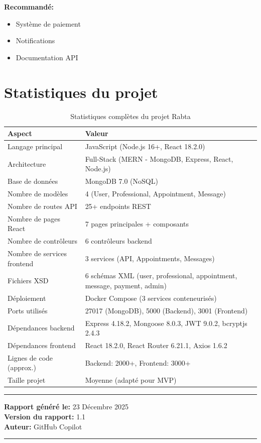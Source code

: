 \documentclass[12pt,a4paper]{article}
\begin{document}
\textbf{Recommandé:}
\begin{itemize}
    \item Système de paiement
    \item Notifications
    \item Documentation API
\end{itemize}

\section{Statistiques du projet}

\begin{table}[h]
\centering
\begin{tabular}{|l|p{8cm}|}
\hline
\textbf{Aspect} & \textbf{Valeur} \\
\hline
Langage principal & JavaScript (Node.js 16+, React 18.2.0) \\
Architecture & Full-Stack (MERN - MongoDB, Express, React, Node.js) \\
Base de données & MongoDB 7.0 (NoSQL) \\
Nombre de modèles & 4 (User, Professional, Appointment, Message) \\
Nombre de routes API & 25+ endpoints REST \\
Nombre de pages React & 7 pages principales + composants \\
Nombre de contrôleurs & 6 contrôleurs backend \\
Nombre de services frontend & 3 services (API, Appointments, Messages) \\
Fichiers XSD & 6 schémas XML (user, professional, appointment, message, payment, admin) \\
Déploiement & Docker Compose (3 services conteneurisés) \\
Ports utilisés & 27017 (MongoDB), 5000 (Backend), 3001 (Frontend) \\
Dépendances backend & Express 4.18.2, Mongoose 8.0.3, JWT 9.0.2, bcryptjs 2.4.3 \\
Dépendances frontend & React 18.2.0, React Router 6.21.1, Axios 1.6.2 \\
Lignes de code (approx.) & Backend: 2000+, Frontend: 3000+ \\
Taille projet & Moyenne (adapté pour MVP) \\
\hline
\end{tabular}
\caption{Statistiques complètes du projet Rabta}
\end{table}

\vfill

\begin{center}
\hrule
\vspace{0.5cm}
\textbf{Rapport généré le:} 23 Décembre 2025 \\
\textbf{Version du rapport:} 1.1 \\
\textbf{Auteur:} GitHub Copilot
\vspace{0.5cm}
\hrule
\end{center}
\end{document}

